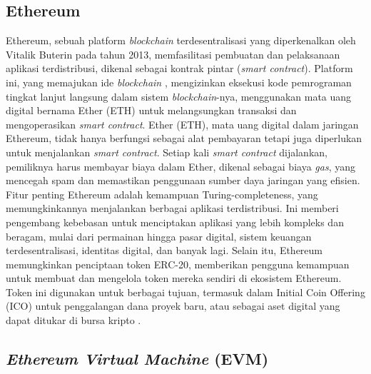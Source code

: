 \subsection{Ethereum}

Ethereum, sebuah platform \emph{blockchain} terdesentralisasi yang diperkenalkan oleh Vitalik Buterin pada tahun 2013, memfasilitasi pembuatan dan pelaksanaan aplikasi terdistribusi, dikenal sebagai kontrak pintar (\emph{smart contract}). Platform ini, yang memajukan ide \emph{blockchain} , mengizinkan eksekusi kode pemrograman tingkat lanjut langsung dalam sistem \emph{blockchain}-nya, menggunakan mata uang digital bernama Ether (ETH) untuk melangsungkan transaksi dan mengoperasikan \emph{smart contract}. Ether (ETH), mata uang digital dalam jaringan Ethereum, tidak hanya berfungsi sebagai alat pembayaran tetapi juga diperlukan untuk menjalankan \emph{smart contract}. Setiap kali \emph{smart contract} dijalankan, pemiliknya harus membayar biaya dalam Ether, dikenal sebagai biaya \emph{gas}, yang mencegah spam dan memastikan penggunaan sumber daya jaringan yang efisien. Fitur penting Ethereum adalah kemampuan Turing-completeness, yang memungkinkannya menjalankan berbagai aplikasi terdistribusi. Ini memberi pengembang kebebasan untuk menciptakan aplikasi yang lebih kompleks dan beragam, mulai dari permainan hingga pasar digital, sistem keuangan terdesentralisasi, identitas digital, dan banyak lagi. Selain itu, Ethereum memungkinkan penciptaan token ERC-20, memberikan pengguna kemampuan untuk membuat dan mengelola token mereka sendiri di ekosistem Ethereum. Token ini digunakan untuk berbagai tujuan, termasuk dalam Initial Coin Offering (ICO) untuk penggalangan dana proyek baru, atau sebagai aset digital yang dapat ditukar di bursa kripto \cite{Antonopoulos2018}.

\subsection{\emph{Ethereum Virtual Machine} (EVM)}

